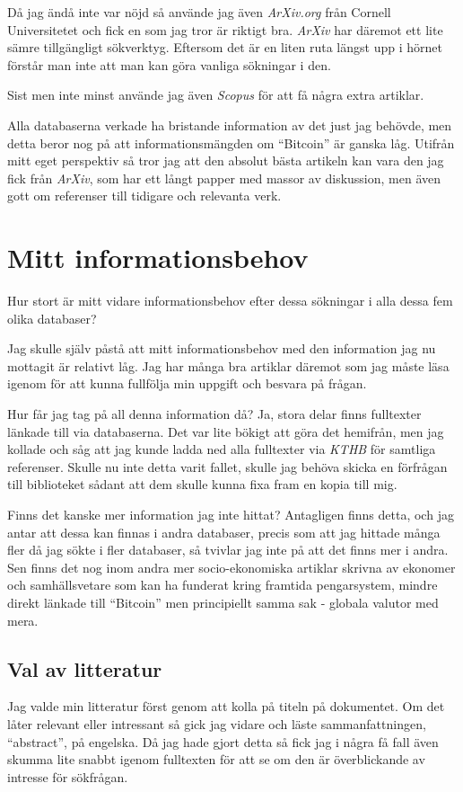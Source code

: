 \documentclass[a4paper,11pt,exjobb]{kth-mag}
\begin{document}
Då jag ändå inte var nöjd så använde jag även \textit{ArXiv.org} från Cornell Universitetet och fick en som jag tror är riktigt bra. \textit{ArXiv} har däremot ett lite sämre tillgängligt sökverktyg. Eftersom det är en liten ruta längst upp i hörnet förstår man inte att man kan göra vanliga sökningar i den.

Sist men inte minst använde jag även \textit{Scopus} för att få några extra artiklar. 

Alla databaserna verkade ha bristande information av det just jag behövde, men detta beror nog på att informationsmängden om ``Bitcoin'' är ganska låg. Utifrån mitt eget perspektiv så tror jag att den absolut bästa artikeln kan vara den jag fick från \textit{ArXiv}, som har ett långt papper med massor av diskussion, men även gott om referenser till tidigare och relevanta verk.

\section{Mitt informationsbehov}
Hur stort är mitt vidare informationsbehov efter dessa sökningar i alla dessa fem olika databaser?

Jag skulle själv påstå att mitt informationsbehov med den information jag nu mottagit är relativt låg. Jag har många bra artiklar däremot som jag måste läsa igenom för att kunna fullfölja min uppgift och besvara på frågan. 

Hur får jag tag på all denna information då? Ja, stora delar finns fulltexter länkade till via databaserna. Det var lite bökigt att göra det hemifrån, men jag kollade och såg att jag kunde ladda ned alla fulltexter via \textit{KTHB} för samtliga referenser. Skulle nu inte detta varit fallet, skulle jag behöva skicka en förfrågan till biblioteket sådant att dem skulle kunna fixa fram en kopia till mig.

Finns det kanske mer information jag inte hittat?
Antagligen finns detta, och jag antar att dessa kan finnas i andra databaser, precis som att jag hittade många fler då jag sökte i fler databaser, så tvivlar jag inte på att det finns mer i andra. Sen finns det nog inom andra mer socio-ekonomiska artiklar skrivna av ekonomer och samhällsvetare som kan ha funderat kring framtida pengarsystem, mindre direkt länkade till ``Bitcoin'' men principiellt samma sak - globala valutor med mera. 

\subsection{Val av litteratur}
Jag valde min litteratur först genom att kolla på titeln på dokumentet. Om det låter relevant eller intressant så gick jag vidare och läste sammanfattningen, ``abstract'', på engelska. Då jag hade gjort detta så fick jag i några få fall även skumma lite snabbt igenom fulltexten för att se om den är överblickande av intresse för sökfrågan.
\end{document}
